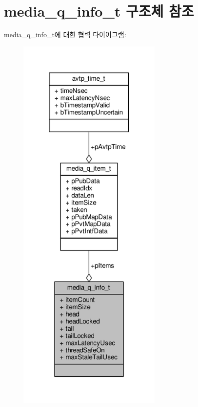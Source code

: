 \hypertarget{structmedia__q__info__t}{}\section{media\+\_\+q\+\_\+info\+\_\+t 구조체 참조}
\label{structmedia__q__info__t}


media\+\_\+q\+\_\+info\+\_\+t에 대한 협력 다이어그램\+:
\nopagebreak
\begin{figure}[H]
\begin{center}
\leavevmode
\includegraphics[width=202pt]{structmedia__q__info__t__coll__graph}
\end{center}
\end{figure}
